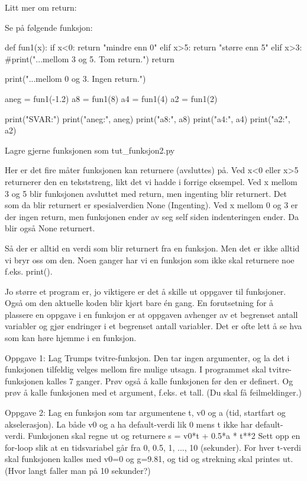 Litt mer om return:

Se på følgende funksjon: 

def fun1(x):
   if x<0:
      return "mindre enn 0"
   elif x>5:
      return "større enn 5"
   elif x>3: 
      #print("...mellom 3 og 5. Tom return.")
      return

   print("...mellom 0 og 3. Ingen return.")

aneg = fun1(-1.2)
a8 = fun1(8)
a4 = fun1(4)
a2 = fun1(2)

print("SVAR:") 
print("aneg:", aneg)
print("a8:", a8)
print("a4:", a4)
print("a2:", a2)

Lagre gjerne funksjonen som tut_funksjon2.py

Her er det fire måter funksjonen kan returnere (avsluttes) på.
Ved x<0 eller x>5 returnerer den en tekststreng, likt det vi hadde i forrige eksempel.
Ved x mellom 3 og 5 blir funksjonen avsluttet med return, men ingenting blir returnert.
Det som da blir returnert er spesialverdien None (Ingenting).
Ved x mellom 0 og 3 er der ingen return, men funksjonen ender av seg self siden 
indenteringen ender. Da blir også None returnert.

Så der er alltid en verdi som blir returnert fra en funksjon.
Men det er ikke alltid vi bryr oss om den.
Noen ganger har vi en funksjon som ikke skal returnere noe f.eks. print(). 



Jo større et program er, jo viktigere er det å skille ut oppgaver til funksjoner.
Også om den aktuelle koden blir kjørt bare én gang. 
En forutsetning for å plassere en oppgave i en funksjon 
er at oppgaven avhenger av et begrenset antall variabler 
og gjør endringer i et begrenset antall variabler. 
Det er ofte lett å se hva som kan høre hjemme i en funksjon. 



Oppgave 1: Lag Trumps tvitre-funksjon. Den tar ingen argumenter, 
og la det i funksjonen tilfeldig velges mellom fire mulige utsagn. 
I programmet skal tvitre-funksjonen kalles 7 ganger. 
Prøv også å kalle funksjonen før den er definert. 
Og prøv å kalle funksjonen med et argument, f.eks. et tall. 
(Du skal få feilmeldinger.) 


Oppgave 2: Lag en funksjon som tar argumentene t, v0 og a 
(tid, startfart og akselerasjon).
La både v0 og a ha default-verdi lik 0 mens t ikke har default-verdi. 
Funksjonen skal regne ut og returnere  s = v0*t + 0.5*a * t**2
Sett opp en for-loop slik at en tidsvariabel går fra 0, 0.5, 1, ..., 10 (sekunder).
For hver t-verdi skal funksjonen kalles med v0=0 og g=9.81, 
og tid og strekning skal printes ut.
(Hvor langt faller man på 10 sekunder?) 

